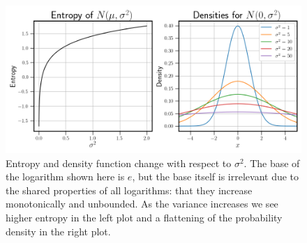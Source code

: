 \begin{figure}[ht]
    \centering
    \includegraphics[width=\textwidth]{Figures/entropy_densities_example.png}

    \caption{Entropy and density function change with respect to $\sigma^2$. The base 
    of the logarithm shown here is $e$, but the base itself is irrelevant due to the shared
    properties of all logarithms: that they increase monotonically and unbounded. As the 
    variance increases we see higher entropy in the left plot and a flattening of the 
    probability density in the right plot.}
    \label{fig:entropy example}
\end{figure}

